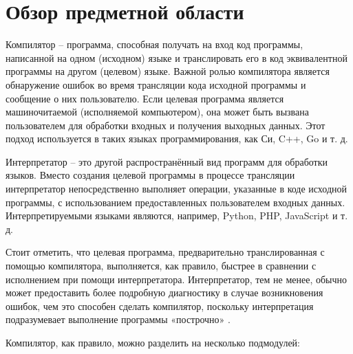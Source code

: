 \newpage
\section{Обзор предметной области}
\label{sec:subject_overview}

Компилятор -- программа, способная получать на вход код программы, написанной на одном (исходном) языке и транслировать его в код эквивалентной программы на другом (целевом) языке.
Важной ролью компилятора является обнаружение ошибок во время трансляции кода исходной программы и сообщение о них пользователю.
Если целевая программа является машиночитаемой (исполняемой компьютером), она может быть вызвана пользователем для обработки входных и получения выходных данных.
Этот подход используется в таких языках программирования, как Си, C++, Go и т. д.

Интерпретатор -- это другой распространённый вид программ для обработки языков.
Вместо создания целевой программы в процессе трансляции интерпретатор непосредственно выполняет операции, указанные в коде исходной программы, с использованием предоставленных пользователем входных данных.
Интерпретируемыми языками являются, например, Python, PHP, JavaScript и т. д.

Стоит отметить, что целевая программа, предварительно транслированная с помощью компилятора, выполняется, как правило, быстрее в сравнении с исполнением при помощи интерпретатора.
Интерпретатор, тем не менее, обычно может предоставить более подробную диагностику в случае возникновения ошибок, чем это способен сделать компилятор, поскольку интерпретация подразумевает выполнение программы «построчно» \cite{dragon_book}.

Компилятор, как правило, можно разделить на несколько подмодулей:


